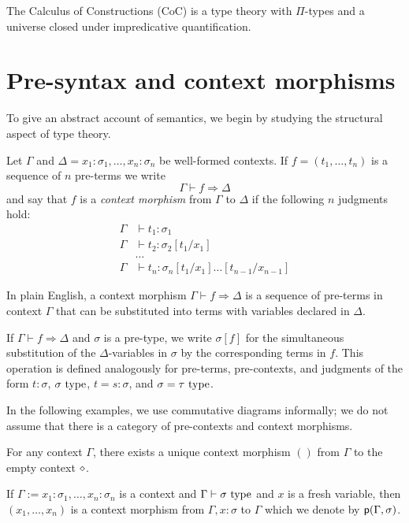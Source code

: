 \documentclass[a4paper]{article}
\begin{document}
The Calculus of Constructions (CoC) is a type theory with $\Pi$-types and a universe closed under impredicative quantification.

\section{Pre-syntax and context morphisms}\label{sec:pscm}

To give an abstract account of semantics, we begin by studying the structural aspect of type theory.

\begin{definition}[Hofmann]
  Let $\Gamma$ and $\Delta = x_1 : \sigma_1,\ldots,x_n : \sigma_n$ be well-formed contexts.
  If $f = (t_1,\ldots,t_n)$ is a sequence of $n$ pre-terms we write
  \[
    \Gamma \vdash f \Rightarrow \Delta
  \]
  and say that $f$ is a \emph{context morphism} from $\Gamma$ to $\Delta$ if the following $n$ judgments hold:
  \begin{align*}
    \Gamma &\vdash t_1 : \sigma_1\\
    \Gamma &\vdash t_2 : \sigma_2[t_1/x_1]\\
    &\ldots\\
    \Gamma &\vdash t_n : \sigma_n[t_1/x_1]\ldots[t_{n-1}/x_{n-1}]
  \end{align*}
\end{definition}

In plain English, a context morphism $\Gamma \vdash f \Rightarrow \Delta$ is a sequence of pre-terms in context $\Gamma$ that can be substituted into terms with variables declared in $\Delta$.

If $\Gamma \vdash f \Rightarrow \Delta$ and $\sigma$ is a pre-type, we write $\sigma[f]$ for the simultaneous substitution of the $\Delta$-variables in $\sigma$ by the corresponding terms in $f$.
This operation is defined analogously for pre-terms, pre-contexts, and judgments of the form $t : \sigma$, $\sigma~\mathrm{type}$, $t = s : \sigma$, and $\sigma = \tau~\mathrm{type}$.

In the following examples, we use commutative diagrams informally; we do not assume that there is a category of pre-contexts and context morphisms.

\begin{example}
  For any context $\Gamma$, there exists a unique context morphism $()$ from $\Gamma$ to the empty context $\diamond$.
\end{example}

\begin{example}
  If $\Gamma := x_1 : \sigma_1,\ldots,x_{n} : \sigma_n$ is a context and $\Gamma \vdash \sigma~\mathrm{type}$ and $x$ is a fresh variable, then $(x_1,\ldots,x_n)$ is a context morphism from $\Gamma, x : \sigma$ to $\Gamma$ which we denote by $\operatorname{\mathsf{p}}(\Gamma,\sigma)$.
\end{example}
\end{document}
